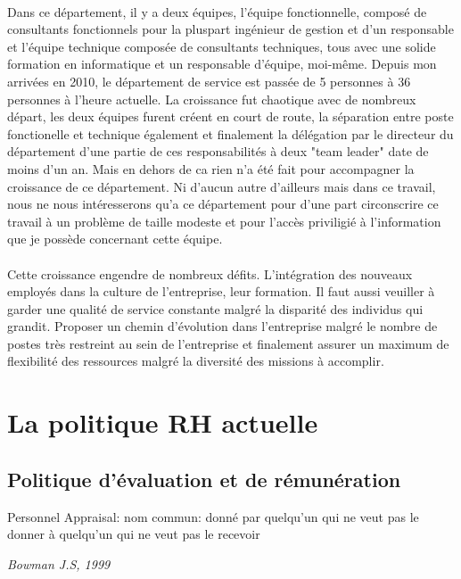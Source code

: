 \paragraph*{}Dans ce département, il y a deux équipes, l'équipe fonctionnelle, composé de consultants fonctionnels pour la pluspart ingénieur de gestion et d'un responsable et l'équipe technique composée de consultants techniques, tous avec une solide formation en informatique et un responsable d'équipe, moi-même. Depuis mon arrivées en 2010, le département de service est passée de 5 personnes à 36 personnes à l'heure actuelle. La croissance fut chaotique avec de nombreux départ, les deux équipes furent créent en court de route, la séparation entre poste fonctionelle et technique également et finalement la délégation par le directeur du département d'une partie de ces responsabilités à deux "team leader" date de moins d'un an. Mais en dehors de ca rien n'a été fait pour accompagner la croissance de ce département. Ni d'aucun autre d'ailleurs mais dans ce travail, nous ne nous intéresserons qu'a ce département pour d'une part circonscrire ce travail à un problème de taille modeste et pour l'accès priviligié à l'information que je possède concernant cette équipe. 


\paragraph*{}Cette croissance engendre de nombreux défits. L'intégration des nouveaux employés dans la culture de l'entreprise, leur formation. Il faut aussi veuiller à garder une qualité de service constante malgré la disparité des individus qui grandit. Proposer un chemin d'évolution dans l'entreprise malgré le nombre de postes très restreint au sein de l'entreprise et finalement assurer un maximum de flexibilité des ressources malgré la diversité des missions à accomplir. 

\section{La politique RH actuelle}
\subsection{Politique d'évaluation et de rémunération} 
\setlength{\epigraphwidth}{0.7\textwidth}
\epigraph{Personnel Appraisal: nom commun: donné par quelqu'un qui ne veut pas le donner à quelqu'un qui ne veut pas le recevoir}{\textit{Bowman J.S, 1999}}


